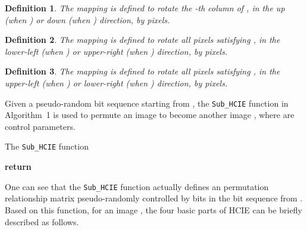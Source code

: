 \documentclass[final,3p,times,twocolumn]{elsarticle}
\newtheorem{definition}{Definition}
\begin{document}
\begin{definition}
The mapping   is defined to
rotate the -th column of , in the up (when ) or down
(when ) direction, by  pixels.
\end{definition}

\begin{definition}
The mapping   is
defined to rotate all pixels satisfying , in the lower-left
(when ) or upper-right (when ) direction, by  pixels.
\end{definition}

\begin{definition}
The mapping   is
defined to rotate all pixels satisfying , in the upper-left
(when ) or lower-right (when ) direction, by  pixels.
\end{definition}

Given a pseudo-random bit sequence  starting from ,
the \texttt{Sub\_HCIE} function in Algorithm~1 is used to permute an
 image  to become another 
image , where  are control
parameters.
\begin{algorithm}
\caption{The \texttt{Sub\_HCIE} function}
\begin{algorithmic}[1]
\For {}
  \State 
  \State 
  \For {}
  \State 
  \EndFor
  \For { }
  \State 
  \EndFor
  \For {}
  \State 
  \EndFor
  \For {}
  \State 
  \EndFor
\EndFor
\State 
\State \textbf{return} 
\EndFunction
\end{algorithmic}
\end{algorithm}
One can see that the \texttt{Sub\_HCIE} function actually
defines an  permutation relationship matrix pseudo-randomly
controlled by  bits in the bit sequence
 from . Based on this function, for an 
image , the four basic parts of HCIE
can be briefly described as follows.
\end{document}
